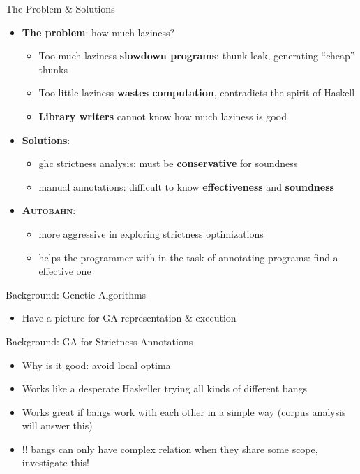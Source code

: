 \documentclass{beamer}
\newcommand{\tname}{\textsc{Autobahn}}
\begin{document}
\begin{frame}{The Problem \& Solutions}
\begin{itemize}
\item \textbf{The problem}: how much laziness?
  \begin{itemize}
    \item Too much laziness \textbf{slowdown programs}: thunk leak, generating ``cheap'' thunks
    \item Too little laziness \textbf{wastes computation}, contradicts the spirit of Haskell
    \item \textbf{Library writers} cannot know how much laziness is good
  \end{itemize}
\item \textbf{Solutions}: 
  \begin{itemize}
    \item ghc strictness analysis: must be \textbf{conservative} for soundness
    \item manual annotations: difficult to know \textbf{effectiveness} and \textbf{soundness}
  \end{itemize}
\item \textbf{\tname{}}:
  \begin{itemize}
    \item more aggressive in exploring strictness optimizations
    \item helps the programmer with in the task of annotating programs: find a 
          effective one
  \end{itemize}
\end{itemize}
\end{frame}

\begin{frame}{Background: Genetic Algorithms}
  \begin{itemize}
    \item Have a picture for GA representation \& execution
  \end{itemize}
\end{frame}

\begin{frame}{Background: GA for Strictness Annotations}
  \begin{itemize}
    \item Why is it good: avoid local optima
    \item Works like a desperate Haskeller trying all kinds of different bangs
    \item Works great if bangs work with each other in a simple way (corpus analysis will answer this)
    \item !! bangs can only have complex relation when they share some scope, investigate this!
  \end{itemize}
\end{frame}
\end{document}

